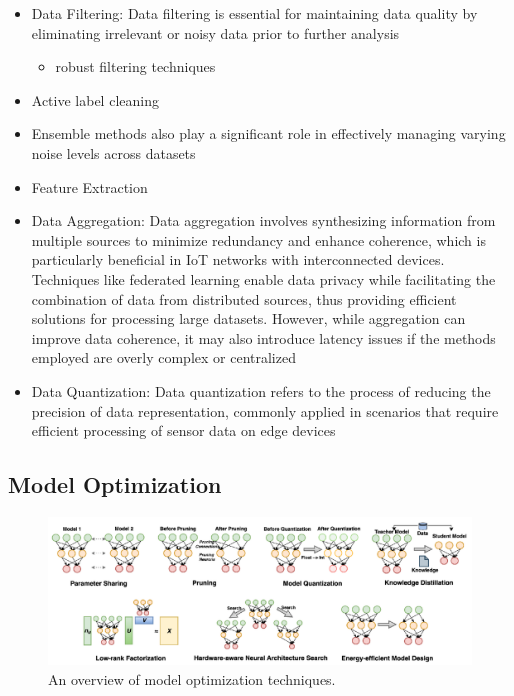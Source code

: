 \begin{itemize}
	\item Data Filtering: Data filtering is essential for maintaining data quality by eliminating irrelevant or noisy data prior to further analysis
		\begin{itemize}
			\item robust filtering techniques
		\end{itemize}
	\item Active label cleaning
	\item Ensemble methods also play a significant role in effectively managing varying noise levels across datasets	
	\item Feature Extraction
	\item Data Aggregation: Data aggregation involves synthesizing information from multiple sources to minimize redundancy and enhance coherence, which is particularly beneficial in IoT networks with interconnected devices. Techniques like federated learning enable data privacy while facilitating the combination of data from distributed sources, thus providing efficient solutions for processing large datasets. However, while aggregation can improve data coherence, it may also introduce latency issues if the methods employed are overly complex or centralized
	\item Data Quantization: Data quantization refers to the process of reducing the precision of data representation, commonly applied in scenarios that require efficient processing of sensor data on edge devices
\end{itemize}

\subsection{Model Optimization}

\begin{figure}[t]
	\centering
	\includegraphics[scale=0.4]{./images/model_optim/overview_model_optim.png}
	\caption{An overview of model optimization techniques.}
\end{figure}

